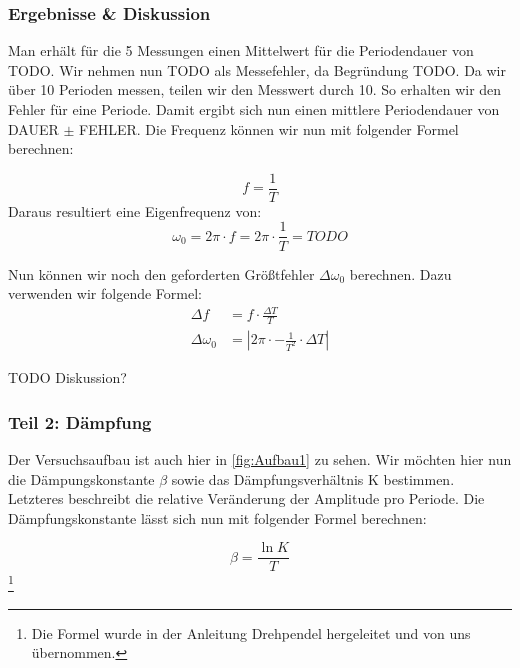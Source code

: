     \subsubsection{Ergebnisse \& Diskussion}
    Man erhält für die 5 Messungen einen Mittelwert für die Periodendauer von TODO. Wir nehmen nun TODO als Messefehler, da Begründung TODO.
    Da wir über 10 Perioden messen, teilen wir den Messwert durch 10. So erhalten wir den Fehler für eine Periode. Damit ergibt sich nun einen mittlere Periodendauer von DAUER $\pm$ FEHLER.
    Die Frequenz können wir nun mit folgender Formel berechnen:

    \begin{equation}
        \label{eq:Frequenz}
        f = \frac{1}{T}
    \end{equation}
    Daraus resultiert eine Eigenfrequenz von:
    \begin{equation}
        \label{eq:Eigenfrequenz}
        \omega_0 = 2\pi \cdot f = 2\pi \cdot \frac{1}{T} = TODO
    \end{equation}

    Nun können wir noch den geforderten Größtfehler $\Delta \omega_0$ berechnen. Dazu verwenden wir folgende Formel:
    \begin{equation}
        \label{eq:Größtfehler}
        \begin{aligned}
        \Delta f &= f \cdot \frac{\Delta T}{T} \\
        \Delta \omega_0 &= \left|2\pi \cdot -\frac{1}{T^2} \cdot \Delta T\right|
        \end{aligned}
    \end{equation}

    TODO Diskussion?
        \subsubsection{Teil 2: Dämpfung}
        Der Versuchsaufbau ist auch hier in \ref{fig:Aufbau1} zu sehen.
        Wir möchten hier nun die Dämpungskonstante $\beta$ sowie das Dämpfungsverhältnis K bestimmen. Letzteres beschreibt die relative Veränderung der Amplitude pro Periode. Die Dämpfungskonstante 
        lässt sich nun mit folgender Formel berechnen:
        \begin{center}
            
        \begin{equation}
            \label{eq:Dämpfungskonstante}
            \beta = \frac{\ln K}{T}
        \end{equation}
        \footnote[1 ]{Die Formel wurde in der Anleitung Drehpendel hergeleitet und von uns übernommen.}
        \end{center}  

